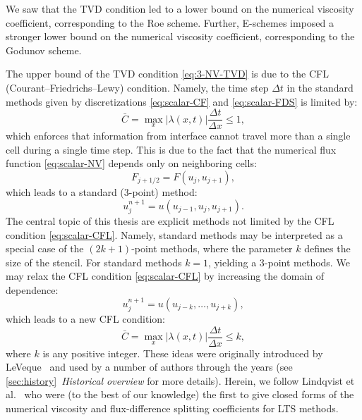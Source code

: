 We saw that the TVD condition led to a lower bound on the numerical viscosity coefficient, corresponding to the Roe scheme. Further, E-schemes imposed a stronger lower bound on the numerical viscosity coefficient, corresponding to the Godunov scheme. 

The upper bound of the TVD condition \eqref{eq:3-NV-TVD} is due to the CFL (Courant--Friedrichs--Lewy) condition. Namely, the time step $ \Delta t $ in the standard methods given by discretizations \eqref{eq:scalar-CF} and \eqref{eq:scalar-FDS} is limited by:
\begin{equation} \label{eq:scalar-CFL}
\bar{C} = \underset{x}{\max} \left| \lambda(x,t) \right| \frac{\Delta t}{\Delta x} \leq 1,
\end{equation}
which enforces that information from interface cannot travel more than a single cell during a single time step. This is due to the fact that the numerical flux function \eqref{eq:scalar-NV} depends only on neighboring cells:
\begin{equation}
F_{j+1/2} = F \left( u_j, u_{j+1} \right), 
\end{equation}
which leads to a standard (3-point) method:
\begin{equation}
u_j^{n+1} = u \left( u_{j-1}, u_j, u_{j+1} \right).
\end{equation}
The central topic of this thesis are explicit methods not limited by the CFL condition \eqref{eq:scalar-CFL}. Namely, standard methods may be interpreted as a special case of the $ (2k+1) $-point methods, where the parameter $ k $ defines the size of the stencil. For standard methods $ k=1 $, yielding a 3-point methods. We may relax the CFL condition \eqref{eq:scalar-CFL} by increasing the domain of dependence:
\begin{equation}
u_j^{n+1} = u \left( u_{j-k}, \dots, u_{j+k} \right),
\end{equation}
which leads to a new CFL condition:
\begin{equation} \label{eq:scalar-CFL-LTS}
\bar{C} = \underset{x}{\max} \left| \lambda(x,t) \right| \frac{\Delta t}{\Delta x} \leq k,
\end{equation}
where $ k $ is any positive integer. These ideas were originally introduced by LeVeque~\cite{lev82,lev84,lev85} and used by a number of authors through the years (see \cref{sec:history}~\textit{Historical overview} for more details). Herein, we follow Lindqvist et al.~\cite{lin16} who were (to the best of our knowledge) the first to give closed forms of the numerical viscosity and flux-difference splitting coefficients for LTS methods.

